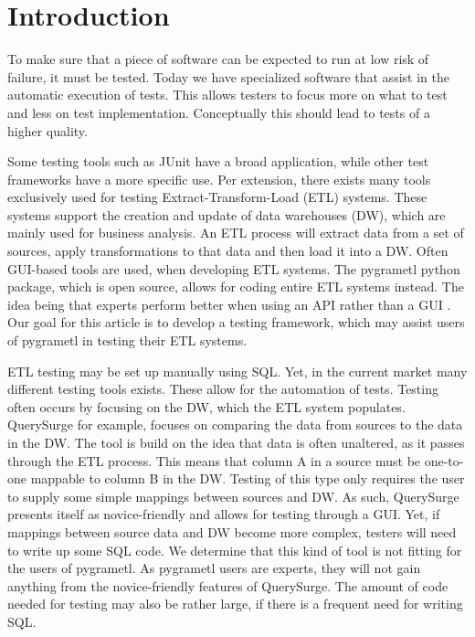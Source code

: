 \section{Introduction}\label{intro} %
To make sure that a piece of software can be expected to run at low risk of failure, it must be tested. Today we have specialized software that assist in the automatic execution of tests. This allows testers to focus more on what to test and less on test implementation. Conceptually this should lead to tests of a higher quality.

Some testing tools such as JUnit have a broad application, while other test frameworks have a more specific use. Per extension, there exists many tools exclusively used for testing Extract-Transform-Load (ETL) systems. These systems support the creation and update of data warehouses (DW), which are mainly used for business analysis. An ETL process will extract data from a set of sources, apply transformations to that data and then load it into a DW. Often GUI-based tools are used, when developing ETL systems. The pygrametl python package, which is open source, allows for coding entire ETL systems instead. The idea being that experts perform better when using an API rather than a GUI \cite{thomsen2009pygrametl}. Our goal for this article is to develop a testing framework, which may assist users of pygrametl in testing their ETL systems.

ETL testing may be set up manually using SQL. Yet, in the current market many different testing tools exists. These allow for the automation of tests. Testing often occurs by focusing on the DW, which the ETL system populates. QuerySurge\cite{QuerySurge} for example, focuses on comparing the data from sources to the data in the DW. The tool is build on the idea that data is often unaltered, as it passes through the ETL process. This means that column A in a source must be one-to-one mappable to column B in the DW. Testing of this type only requires the user to supply some simple mappings between sources and DW. As such, QuerySurge presents itself as novice-friendly and allows for testing through a GUI. Yet, if mappings between source data and DW become more complex, testers will need to write up some SQL code. We determine that this kind of tool is not fitting for the users of pygrametl. As pygrametl users are experts, they will not gain anything from the novice-friendly features of QuerySurge. The amount of code needed for testing may also be rather large, if there is a frequent need for writing SQL.

